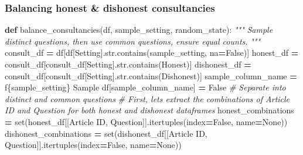\documentclass[
]{article}
\newenvironment{Shaded}{\begin{snugshade}}{\end{snugshade}}
\newcommand{\BuiltInTok}[1]{#1}
\newcommand{\CommentTok}[1]{\textcolor[rgb]{0.56,0.35,0.01}{\textit{#1}}}
\newcommand{\KeywordTok}[1]{\textcolor[rgb]{0.13,0.29,0.53}{\textbf{#1}}}
\newcommand{\NormalTok}[1]{#1}
\newcommand{\OperatorTok}[1]{\textcolor[rgb]{0.81,0.36,0.00}{\textbf{#1}}}
\newcommand{\SpecialCharTok}[1]{\textcolor[rgb]{0.00,0.00,0.00}{#1}}
\newcommand{\SpecialStringTok}[1]{\textcolor[rgb]{0.31,0.60,0.02}{#1}}
\newcommand{\StringTok}[1]{\textcolor[rgb]{0.31,0.60,0.02}{#1}}
\newcommand{\VariableTok}[1]{\textcolor[rgb]{0.00,0.00,0.00}{#1}}
\begin{document}
\hypertarget{balancing-honest-dishonest-consultancies}{%
\subsubsection{Balancing honest \& dishonest
consultancies}\label{balancing-honest-dishonest-consultancies}}

\begin{Shaded}
\begin{Highlighting}[]
\KeywordTok{def}\NormalTok{ balance\_consultancies(df, sample\_setting, random\_state):}
    \CommentTok{"""}
\CommentTok{    Sample distinct questions, then use common questions, ensure equal counts.}
\CommentTok{    """}
\NormalTok{    consult\_df }\OperatorTok{=}\NormalTok{ df[df[}\StringTok{\textquotesingle{}Setting\textquotesingle{}}\NormalTok{].}\BuiltInTok{str}\NormalTok{.contains(sample\_setting, na}\OperatorTok{=}\VariableTok{False}\NormalTok{)]}
\NormalTok{    honest\_df }\OperatorTok{=}\NormalTok{ consult\_df[consult\_df[}\StringTok{\textquotesingle{}Setting\textquotesingle{}}\NormalTok{].}\BuiltInTok{str}\NormalTok{.contains(}\StringTok{\textquotesingle{}Honest\textquotesingle{}}\NormalTok{)]}
\NormalTok{    dishonest\_df }\OperatorTok{=}\NormalTok{ consult\_df[consult\_df[}\StringTok{\textquotesingle{}Setting\textquotesingle{}}\NormalTok{].}\BuiltInTok{str}\NormalTok{.contains(}\StringTok{\textquotesingle{}Dishonest\textquotesingle{}}\NormalTok{)]}
\NormalTok{    sample\_column\_name }\OperatorTok{=} \SpecialStringTok{f\textquotesingle{}}\SpecialCharTok{\{}\NormalTok{sample\_setting}\SpecialCharTok{\}}\SpecialStringTok{ Sample\textquotesingle{}}
\NormalTok{    df[sample\_column\_name] }\OperatorTok{=} \VariableTok{False}
    \CommentTok{\# Separate into distinct and common questions}
    \CommentTok{\# First, let\textquotesingle{}s extract the combinations of \textquotesingle{}Article ID\textquotesingle{} and \textquotesingle{}Question\textquotesingle{} for both honest and dishonest dataframes}
\NormalTok{    honest\_combinations }\OperatorTok{=} \BuiltInTok{set}\NormalTok{(honest\_df[[}\StringTok{\textquotesingle{}Article ID\textquotesingle{}}\NormalTok{, }\StringTok{\textquotesingle{}Question\textquotesingle{}}\NormalTok{]].itertuples(index}\OperatorTok{=}\VariableTok{False}\NormalTok{, name}\OperatorTok{=}\VariableTok{None}\NormalTok{))}
\NormalTok{    dishonest\_combinations }\OperatorTok{=} \BuiltInTok{set}\NormalTok{(dishonest\_df[[}\StringTok{\textquotesingle{}Article ID\textquotesingle{}}\NormalTok{, }\StringTok{\textquotesingle{}Question\textquotesingle{}}\NormalTok{]].itertuples(index}\OperatorTok{=}\VariableTok{False}\NormalTok{, name}\OperatorTok{=}\VariableTok{None}\NormalTok{))}

\end{Highlighting}
\end{Shaded}
\end{document}
